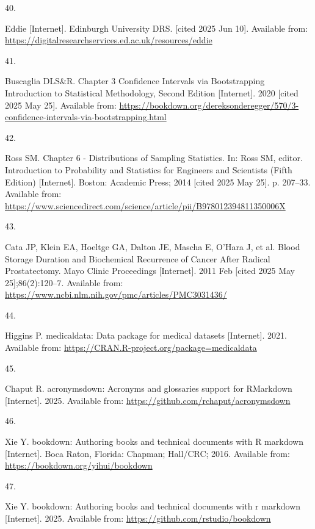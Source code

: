 \documentclass[
]{article}
\newlength{\cslhangindent}
\newlength{\csllabelwidth}
\newenvironment{CSLReferences}[2] %
 {\begin{list}{}{%
  \setlength{\itemindent}{0pt}
  \setlength{\leftmargin}{0pt}
  \setlength{\parsep}{0pt}
  \ifodd #1
   \setlength{\leftmargin}{\cslhangindent}
   \setlength{\itemindent}{-1\cslhangindent}
  \fi
  \setlength{\itemsep}{#2\baselineskip}}}
 {\end{list}}
\newcommand{\CSLLeftMargin}[1]{\parbox[t]{\csllabelwidth}{\strut#1\strut}}
\newcommand{\CSLRightInline}[1]{\parbox[t]{\linewidth - \csllabelwidth}{\strut#1\strut}}
\begin{document}
\begin{CSLReferences}{0}{1}
\CSLLeftMargin{40. }%
\CSLRightInline{Eddie {[}Internet{]}. Edinburgh University DRS. {[}cited 2025 Jun 10{]}. Available from: \url{https://digitalresearchservices.ed.ac.uk/resources/eddie}}

\CSLLeftMargin{41. }%
\CSLRightInline{Buscaglia DLS\&R. Chapter 3 {Confidence} {Intervals} via {Bootstrapping} {\textbar} {Introduction} to {Statistical} {Methodology}, {Second} {Edition} {[}Internet{]}. 2020 {[}cited 2025 May 25{]}. Available from: \url{https://bookdown.org/dereksonderegger/570/3-confidence-intervals-via-bootstrapping.html}}

\CSLLeftMargin{42. }%
\CSLRightInline{Ross SM. Chapter 6 - {Distributions} of {Sampling} {Statistics}. In: Ross SM, editor. Introduction to {Probability} and {Statistics} for {Engineers} and {Scientists} ({Fifth} {Edition}) {[}Internet{]}. Boston: Academic Press; 2014 {[}cited 2025 May 25{]}. p. 207--33. Available from: \url{https://www.sciencedirect.com/science/article/pii/B978012394811350006X}}

\CSLLeftMargin{43. }%
\CSLRightInline{Cata JP, Klein EA, Hoeltge GA, Dalton JE, Mascha E, O'Hara J, et al. Blood {Storage} {Duration} and {Biochemical} {Recurrence} of {Cancer} {After} {Radical} {Prostatectomy}. Mayo Clinic Proceedings {[}Internet{]}. 2011 Feb {[}cited 2025 May 25{]};86(2):120--7. Available from: \url{https://www.ncbi.nlm.nih.gov/pmc/articles/PMC3031436/}}

\CSLLeftMargin{44. }%
\CSLRightInline{Higgins P. {medicaldata}: Data package for medical datasets {[}Internet{]}. 2021. Available from: \url{https://CRAN.R-project.org/package=medicaldata}}

\CSLLeftMargin{45. }%
\CSLRightInline{Chaput R. {acronymsdown}: Acronyms and glossaries support for RMarkdown {[}Internet{]}. 2025. Available from: \url{https://github.com/rchaput/acronymsdown}}

\CSLLeftMargin{46. }%
\CSLRightInline{Xie Y. {bookdown}: Authoring books and technical documents with {R} markdown {[}Internet{]}. Boca Raton, Florida: Chapman; Hall/CRC; 2016. Available from: \url{https://bookdown.org/yihui/bookdown}}

\CSLLeftMargin{47. }%
\CSLRightInline{Xie Y. {bookdown}: Authoring books and technical documents with r markdown {[}Internet{]}. 2025. Available from: \url{https://github.com/rstudio/bookdown}}


\end{CSLReferences}
\end{document}
